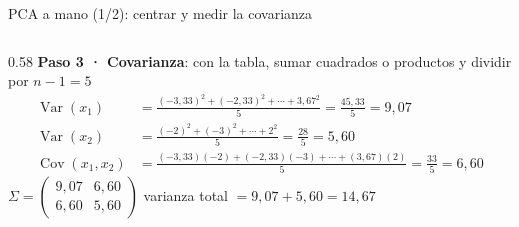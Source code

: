 \documentclass[aspectratio=169,12pt]{beamer}
\begin{document}
\begin{frame}{PCA a mano (1/2): centrar y medir la covarianza}
\begin{columns}[T]
\begin{column}{0.58\textwidth}
      \textbf{Paso 3 · Covarianza}: con la tabla, sumar cuadrados o productos y dividir por $n-1=5$
      \[ \begin{aligned}
        \operatorname{Var}(x_1) &= \tfrac{(-3{,}33)^2 + (-2{,}33)^2 + \cdots + 3{,}67^2}{5} = \tfrac{45{,}33}{5} = 9{,}07\\
        \operatorname{Var}(x_2) &= \tfrac{(-2)^2 + (-3)^2 + \cdots + 2^2}{5} = \tfrac{28}{5} = 5{,}60\\
        \operatorname{Cov}(x_1,x_2) &= \tfrac{(-3{,}33)(-2) + (-2{,}33)(-3) + \cdots + (3{,}67)(2)}{5} = \tfrac{33}{5} = 6{,}60
      \end{aligned} \]
      $\Sigma = \begin{pmatrix} 9{,}07 & 6{,}60 \\ 6{,}60 & 5{,}60 \end{pmatrix}$
      \quad varianza total $= 9{,}07 + 5{,}60 = 14{,}67$
    \end{column}
  \end{columns}
\end{frame}
\end{document}
